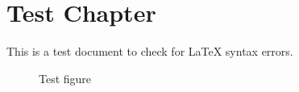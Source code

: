 \documentclass[12pt,a4paper]{book}
\begin{document}
\chapter{Test Chapter}

This is a test document to check for LaTeX syntax errors.

\begin{figure}[H]
\centering
\caption{Test figure}
\label{fig:test}
\end{figure}
\end{document}
